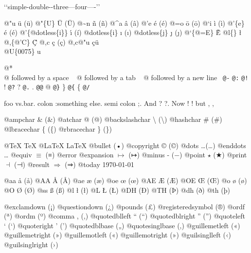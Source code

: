 \documentclass{book}
\renewcommand{\_}{\Texinfounderscore\discretionary{}{}{}}
\begin{document}
\begin{titlepage}
`\hbox{}`simple-double-\hbox{}-three---four----'\hbox{}'\leavevmode{}\\

%
%
%
%

@"u \"{u} (ü)
@"\{U\} \"{U} (Ü) 
@\~{}n \~{n} (ñ)
@\^{}a \^{a} (â)
@'e \'{e} (é)
@=o \={o} (ō)
@`i \`{i} (ì)
@'\{e\} \'{e} (é)
@'\{@dotless\{i\}\} \'{\i{}} (í)
@dotless\{i\} \i{} (ı)
@dotless\{j\} \j{} (ȷ)
@`\{@=E\} \`{\={E}}
@l\{\} \l{}
@,\{@'C\} \c{\'{C}}
@,c \c{c} (ç)
@,c@"u \c{c}\"{u} \leavevmode{}\\

@U\{0075\} u

@* \leavevmode{}\\
@ followed by a space
\ {}
@ followed by a tab
\ {}
@ followed by a new line
\ {}\texttt{@-} \-{}
\texttt{@:} \@
\texttt{@!} \@!
\texttt{@?} \@?
\texttt{@.} \@.
\texttt{@@} @
\texttt{@\}} \}
\texttt{@\{} \{
\texttt{@/} 

foo vs.\@ bar. 
colon :\@And something else.
semi colon ;\@.
And ? ?\@.
Now ! !\@@
but , ,\@

@ampchar \& (\&)
@atchar @ (@)
@backslashchar \textbackslash{} (\textbackslash{})
@hashchar \# (\#)
@lbracechar \{ (\{)
@rbracechar \} (\})

@TeX \TeX{}
@LaTeX \LaTeX{}
@bullet \textbullet{} (•)
@copyright \copyright{} (©)
@dots \dots{}\@ (…)
@enddots \dots{}
@equiv $\equiv{}$ (≡)
@error 
@expansion $\mapsto{}$ (↦)
@minus - (−)
@point $\star{}$ (★)
@print $\dashv{}$ (⊣)
@result $\Rightarrow{}$ (⇒)
@today \today{}

@aa \aa{} (å)
@AA \AA{} (Å)
@ae \ae{} (æ)
@oe \oe{} (œ)
@AE \AE{} (Æ)
@OE \OE{} (Œ)
@o \o{} (ø)
@O \O{} (Ø)
@ss \ss{} (ß)
@l \l{} (ł)
@L \L{} (Ł)
@DH \DH{} (Ð)
@TH \TH{} (Þ)
@dh \dh{} (ð)
@th \th{} (þ)

@exclamdown \textexclamdown{} (¡)
@questiondown \textquestiondown{} (¿)
@pounds \textsterling{} (£)
@registeredsymbol \circledR{} (®)
@ordf \textordfeminine{} (ª)
@ordm \textordmasculine{} (º)
@comma , (,)
@quotedblleft \textquotedblleft{} (“)
@quotedblright \textquotedblright{} (”)
@quoteleft \textquoteleft{} (‘)
@quoteright \textquoteright{} (’)
@quotedblbase \quotedblbase{} („)
@quotesinglbase \quotesinglbase{} (‚)
@guillemetleft \guillemotleft{} («)
@guillemetright \guillemotright{} (»)
@guillemotleft \guillemotleft{} («)
@guillemotright \guillemotright{} (»)
@guilsinglleft \guilsinglleft{} (‹)
@guilsinglright \guilsinglright{} (›)


\end{titlepage}
\end{document}
